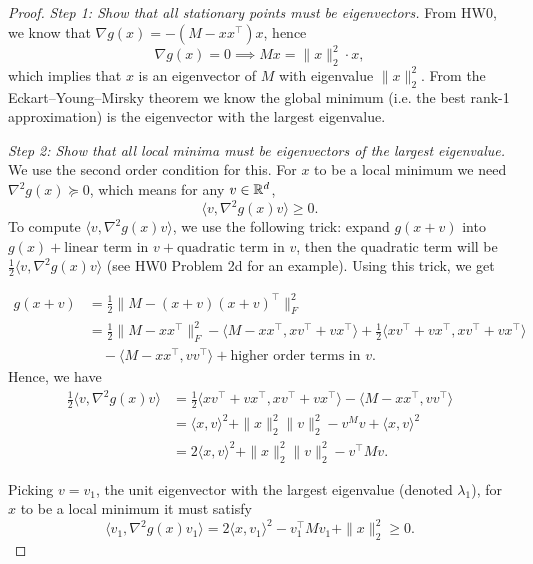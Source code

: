 \begin{proof}

\textit{Step 1: Show that all stationary points must be eigenvectors.} From HW0, we know that $\nabla g(x) = -(M - xx^\top )x$, hence
\begin{equation}\label{lec10:eqn:pca-firstorder}
\nabla g(x) = 0 \implies Mx = \|x\|_2^2\cdot x,
\end{equation}
which implies that $x$ is an eigenvector of $M$ with eigenvalue $\|x\|_2^2$. From the Eckart–Young–Mirsky theorem we know the global minimum (i.e. the best rank-1 approximation) is the eigenvector with the largest eigenvalue.

\textit{Step 2: Show that all local minima must be eigenvectors of the largest eigenvalue.} We use the second order condition for this. For $x$ to be a local minimum we need $\nabla^2g(x) \succeq 0$, which means for any $v \in  \mathbb R^d$, 
\begin{equation}
\langle v, \nabla^2g(x) v \rangle \geq 0.
\end{equation}
To compute $\langle v, \nabla^2g(x) v \rangle$, we use the following trick: expand $g(x + v)$ into $g(x) + \text{linear term in } v + \text{quadratic term in } v$, then the quadratic term will be $\frac{1}{2}\langle v, \nabla^2g(x) v \rangle$ (see HW0 Problem 2d for an example). Using this trick, we get 

\begin{align}
    g(x+v) &= \frac{1}{2}\|M - (x+v)(x+v)^\top \|_F^2 \\
           &= \frac{1}{2}\|M-xx^\top\|_F^2 - \langle M-xx^\top , xv^\top + vx^\top\rangle + \frac{1}{2}\langle xv^\top + vx^\top , xv^\top + vx^\top \rangle \nonumber \\
          & \quad -\langle M-xx^\top, vv^\top\rangle + \text{higher order terms in }v.
\end{align}
Hence, we have 
\begin{align}
    \frac{1}{2}\langle v, \nabla^2g(x) v \rangle & = \frac{1}{2}\langle xv^\top + vx^\top, xv^\top + vx^\top \rangle
          -\langle M-xx^\top, vv^\top\rangle  \\
          &= \langle x, v\rangle^2 + \|x\|_2^2\|v\|_2^2 - v^ Mv + \langle x, v\rangle^2 \\
          & = 2\langle x, v\rangle^2 + \|x\|_2^2\|v\|_2^2 - v^\top Mv.
\end{align}

Picking $v = v_1$, the unit eigenvector with the largest eigenvalue (denoted $\lambda_1$), for $x$ to be a local minimum it must satisfy 
\begin{equation}
\langle v_1, \nabla^2g(x) v_1 \rangle = 2\langle x, v_1 \rangle^2 - v_1^\top Mv_1 + \|x\|_2^2 \geq 0.
\end{equation}


\end{proof}
